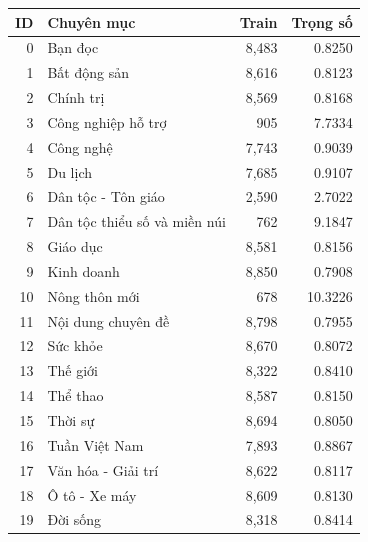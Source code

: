\begin{tabularx}{\linewidth}{r>{\raggedright\arraybackslash}Xrr}
\toprule
ID & Chuyên mục & Train & Trọng số\\\midrule
0 & Bạn đọc & 8,483 & 0.8250\\
1 & Bất động sản & 8,616 & 0.8123\\
2 & Chính trị & 8,569 & 0.8168\\
3 & Công nghiệp hỗ trợ & 905 & 7.7334\\
4 & Công nghệ & 7,743 & 0.9039\\
5 & Du lịch & 7,685 & 0.9107\\
6 & Dân tộc - Tôn giáo & 2,590 & 2.7022\\
7 & Dân tộc thiểu số và miền núi & 762 & 9.1847\\
8 & Giáo dục & 8,581 & 0.8156\\
9 & Kinh doanh & 8,850 & 0.7908\\
10 & Nông thôn mới & 678 & 10.3226\\
11 & Nội dung chuyên đề & 8,798 & 0.7955\\
12 & Sức khỏe & 8,670 & 0.8072\\
13 & Thế giới & 8,322 & 0.8410\\
14 & Thể thao & 8,587 & 0.8150\\
15 & Thời sự & 8,694 & 0.8050\\
16 & Tuần Việt Nam & 7,893 & 0.8867\\
17 & Văn hóa - Giải trí & 8,622 & 0.8117\\
18 & Ô tô - Xe máy & 8,609 & 0.8130\\
19 & Đời sống & 8,318 & 0.8414\\
\bottomrule\end{tabularx}
